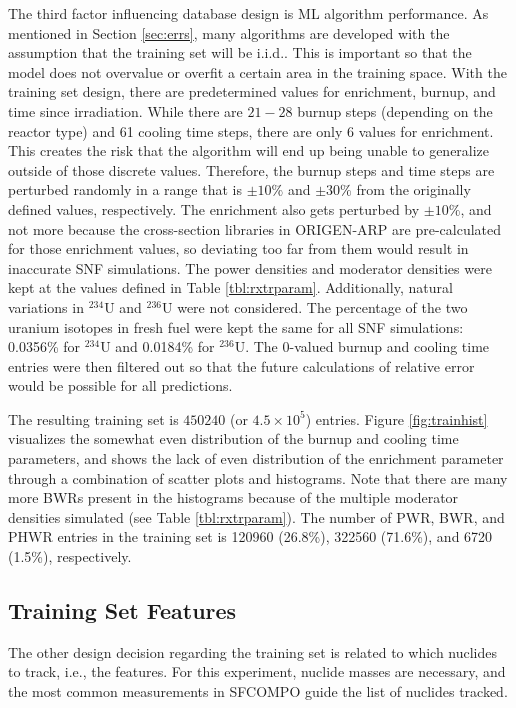 The third factor influencing database design is \gls{ML} algorithm performance.
As mentioned in Section \ref{sec:errs}, many algorithms are developed with the
assumption that the training set will be \acrfull{i.i.d.}.  This is important
so that the model does not overvalue or overfit a certain area in the training
space. With the training set design, there are predetermined values for
enrichment, burnup, and time since irradiation.  While there are $21-28$ burnup
steps (depending on the reactor type) and 61 cooling time steps, there are only
6 values for enrichment. This creates the risk that the algorithm will end up
being unable to generalize outside of those discrete values. Therefore, the
burnup steps and time steps are perturbed randomly in a range that is $\pm10\%$
and $\pm30\%$ from the originally defined values, respectively.  The enrichment
also gets perturbed by $\pm10\%$, and not more because the cross-section
libraries in \gls{ORIGEN-ARP} are pre-calculated for those enrichment values,
so deviating too far from them would result in inaccurate \gls{SNF}
simulations. The power densities and moderator densities were kept at the
values defined in Table \ref{tbl:rxtrparam}.  Additionally, natural variations
in ${}^{234}\text{U}$ and ${}^{236}\text{U}$ were not considered.  The
percentage of the two uranium isotopes in fresh fuel were kept the same for all
\gls{SNF} simulations: 0.0356\% for ${}^{234}\text{U}$ and 0.0184\% for
${}^{236}\text{U}$.  The 0-valued burnup and cooling time entries were then
filtered out so that the future calculations of relative error would be
possible for all predictions.  

The resulting training set is $450240$ (or $4.5 \times 10^5$) entries.  Figure
\ref{fig:trainhist} visualizes the somewhat even distribution of the burnup and
cooling time parameters, and shows the lack of even distribution of the
enrichment parameter through a combination of scatter plots and histograms.
Note that there are many more \gls{BWR}s present in the histograms because of
the multiple moderator densities simulated (see Table \ref{tbl:rxtrparam}). The
number of \gls{PWR}, \gls{BWR}, and \gls{PHWR} entries in the training set is
120960 (26.8\%), 322560 (71.6\%), and 6720 (1.5\%), respectively.

\subsection{Training Set Features}
\label{sec:snffeats}

The other design decision regarding the training set is related to
which nuclides to track, i.e., the features.  For this experiment, nuclide
masses are necessary, and the most common measurements in \gls{SFCOMPO} guide
the list of nuclides tracked.  

